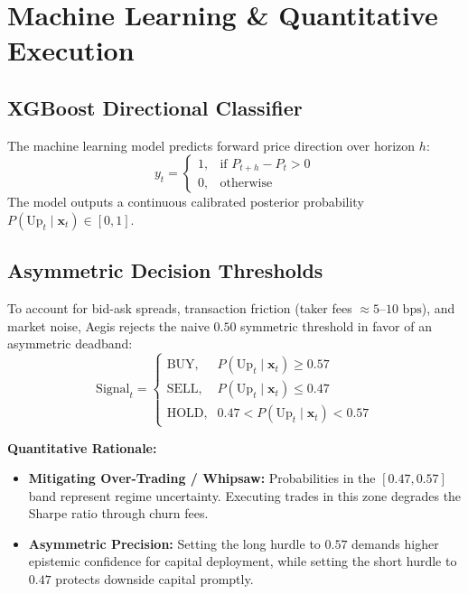 \documentclass[11pt,a4paper]{article}
\begin{document}
\section{Machine Learning \& Quantitative Execution}

\subsection{XGBoost Directional Classifier}
The machine learning model predicts forward price direction over horizon $h$:
$$y_t = \begin{cases} 1, & \text{if } P_{t+h} - P_t > 0 \\ 0, & \text{otherwise} \end{cases}$$
The model outputs a continuous calibrated posterior probability $P(\text{Up}_t \mid \mathbf{x}_t) \in [0, 1]$.

\subsection{Asymmetric Decision Thresholds}
To account for bid-ask spreads, transaction friction (taker fees $\approx 5\text{--}10\text{ bps}$), and market noise, Aegis rejects the naive $0.50$ symmetric threshold in favor of an asymmetric deadband:
$$\text{Signal}_t = \begin{cases} 
\text{BUY}, & P(\text{Up}_t \mid \mathbf{x}_t) \ge 0.57 \\ 
\text{SELL}, & P(\text{Up}_t \mid \mathbf{x}_t) \le 0.47 \\ 
\text{HOLD}, & 0.47 < P(\text{Up}_t \mid \mathbf{x}_t) < 0.57 
\end{cases}$$

\textbf{Quantitative Rationale:}
\begin{itemize}[leftmargin=1.5em]
  \item \textbf{Mitigating Over-Trading / Whipsaw:} Probabilities in the $[0.47, 0.57]$ band represent regime uncertainty. Executing trades in this zone degrades the Sharpe ratio through churn fees.
  \item \textbf{Asymmetric Precision:} Setting the long hurdle to $0.57$ demands higher epistemic confidence for capital deployment, while setting the short hurdle to $0.47$ protects downside capital promptly.
\end{itemize}
\end{document}
